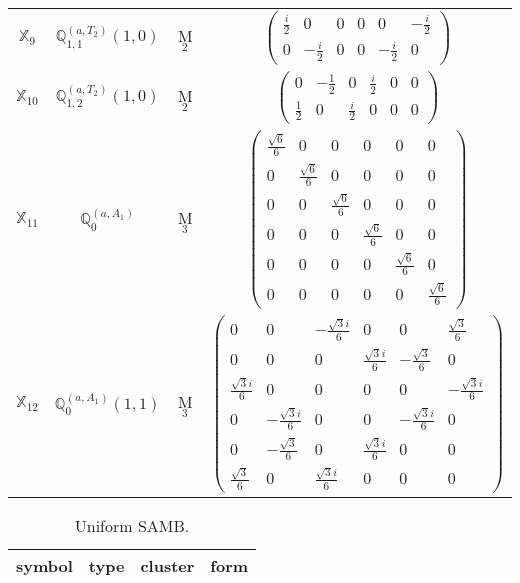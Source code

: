 \documentclass[fleqn,10pt,landscape]{article}
\begin{document}
\begin{itemize}
\begin{center}
\begin{longtable}{c|c|c|c}
$ \mathbb{X}_{9} $ & $\mathbb{Q}_{1,1}^{(a,T_{2})}(1,0)$ & M$_{2}$ & $\begin{pmatrix} \frac{i}{2} & 0 & 0 & 0 & 0 & - \frac{i}{2} \\ 0 & - \frac{i}{2} & 0 & 0 & - \frac{i}{2} & 0 \end{pmatrix}$ \\
$ \mathbb{X}_{10} $ & $\mathbb{Q}_{1,2}^{(a,T_{2})}(1,0)$ & M$_{2}$ & $\begin{pmatrix} 0 & - \frac{1}{2} & 0 & \frac{i}{2} & 0 & 0 \\ \frac{1}{2} & 0 & \frac{i}{2} & 0 & 0 & 0 \end{pmatrix}$ \\ \hline
$ \mathbb{X}_{11} $ & $\mathbb{Q}_{0}^{(a,A_{1})}$ & M$_{3}$ & $\begin{pmatrix} \frac{\sqrt{6}}{6} & 0 & 0 & 0 & 0 & 0 \\ 0 & \frac{\sqrt{6}}{6} & 0 & 0 & 0 & 0 \\ 0 & 0 & \frac{\sqrt{6}}{6} & 0 & 0 & 0 \\ 0 & 0 & 0 & \frac{\sqrt{6}}{6} & 0 & 0 \\ 0 & 0 & 0 & 0 & \frac{\sqrt{6}}{6} & 0 \\ 0 & 0 & 0 & 0 & 0 & \frac{\sqrt{6}}{6} \end{pmatrix}$ \\
$ \mathbb{X}_{12} $ & $\mathbb{Q}_{0}^{(a,A_{1})}(1,1)$ & M$_{3}$ & $\begin{pmatrix} 0 & 0 & - \frac{\sqrt{3} i}{6} & 0 & 0 & \frac{\sqrt{3}}{6} \\ 0 & 0 & 0 & \frac{\sqrt{3} i}{6} & - \frac{\sqrt{3}}{6} & 0 \\ \frac{\sqrt{3} i}{6} & 0 & 0 & 0 & 0 & - \frac{\sqrt{3} i}{6} \\ 0 & - \frac{\sqrt{3} i}{6} & 0 & 0 & - \frac{\sqrt{3} i}{6} & 0 \\ 0 & - \frac{\sqrt{3}}{6} & 0 & \frac{\sqrt{3} i}{6} & 0 & 0 \\ \frac{\sqrt{3}}{6} & 0 & \frac{\sqrt{3} i}{6} & 0 & 0 & 0 \end{pmatrix}$ \\
\end{longtable}
\end{center}
\begin{center}
\renewcommand{\arraystretch}{1.3}
\begin{longtable}{c|c|c|c}
\caption{Uniform SAMB.}
 \\
 \hline \hline
symbol & type & cluster & form \\ \hline \endfirsthead


\end{longtable}
\end{center}
\end{itemize}
\end{document}
